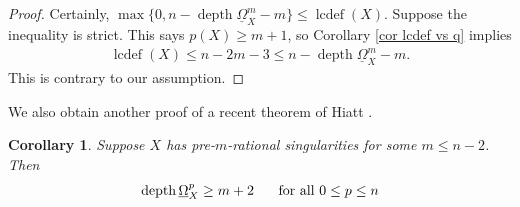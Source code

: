 \documentclass[11pt]{amsart}
\newtheorem{corollary}[equation]{Corollary}
\theoremstyle{definition}
\theoremstyle{plain}
\DeclareMathOperator{\lcdef}{lcdef}
\DeclareMathOperator{\depth}{depth}
\begin{document}
\begin{proof}
Certainly, $\max \{ 0, n-\depth \underline{\Omega}_X^m -m \} \leq \lcdef(X)$. Suppose the inequality is strict. This says $p(X) \geq m+1$, so Corollary \ref{cor lcdef vs q} implies
\begin{align*}
    \lcdef(X) \leq n-2m-3 \leq n - \depth \underline{\Omega}_X^m - m.
\end{align*}
This is contrary to our assumption.
\end{proof}



We also obtain another proof of a recent theorem of Hiatt \cite[Theorem $0.4$]{hiatt}.

\begin{corollary}
Suppose $X$ has pre-$m$-rational singularities for some $m \leq n-2$. Then
\begin{align*}
    \depth \underline{\Omega}_X^p \geq m+2 \hspace{.5cm} \text{ for all } 0 \leq p \leq n
\end{align*}
\end{corollary}
\end{document}
